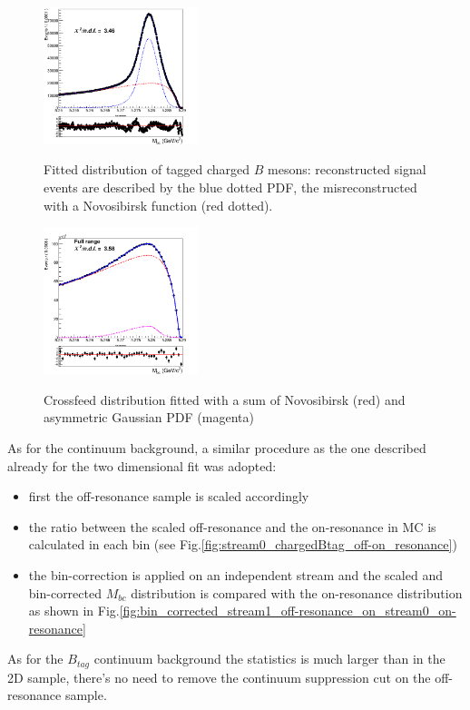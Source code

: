 \begin{figure}[h!]
\centering
{\includegraphics[width=0.40\textwidth]{04-chargedCorrBtoLambda/figs/stream0_chargedBtag_Total_Signal_fit_restrictedRange.png}}
\caption{Fitted distribution of tagged charged $B$ mesons: reconstructed signal events are described by the blue dotted PDF, the misreconstructed with a Novosibirsk function (red dotted). }
\label{fig:stream0_chargedBtag_Total_Signal_fit_restrictedRange}
\end{figure}

\begin{figure}[h!]
\centering
{\includegraphics[width=0.40\textwidth]{04-chargedCorrBtoLambda/figs/NeutralCrossfeed_stream0_corrLambdaC_chargedBtagFit.png}}
\caption{Crossfeed distribution fitted with a sum of Novosibirsk (red) and asymmetric Gaussian PDF (magenta)}
\label{fig:NeutralCrossfeed_stream0_corrLambdaC_chargedBtagFit}
\end{figure}

\newpage

\noindent  As for the continuum background, a similar procedure as the one described already for the two dimensional fit was adopted:

\begin{itemize}
    \item first the off-resonance sample is scaled accordingly
    \item the ratio between the scaled off-resonance and the on-resonance in MC is calculated in each bin (see Fig.\ref{fig:stream0_chargedBtag_off-on_resonance})
    \item the bin-correction is applied on an independent stream and the scaled and bin-corrected $M_{bc}$ distribution is compared with the on-resonance distribution as shown in Fig.\ref{fig:bin_corrected_stream1_off-resonance_on_stream0_on-resonance}
\end{itemize}
\vspace{0.5cm}
As for the $B_{tag}$ continuum background the statistics is much larger than in the 2D sample, there's no need to remove the continuum suppression cut on the off-resonance sample. 

